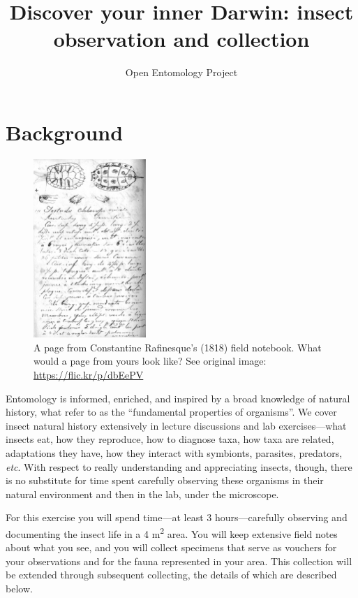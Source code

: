 \documentclass[letterpaper, 11pt]{article}
\title{Discover your inner Darwin: insect observation and collection}
\author{Open Entomology Project}
\begin{document}
\cleanlookdateon %
\maketitle
\thispagestyle{fancy}

\section*{Background}
\begin{figure}
  \vspace{-20pt}
  \begin{center}
    \includegraphics[width=0.38\textwidth]{Rafinesque}
  \end{center}
  \vspace{-16pt}
  \caption{A page from Constantine Rafinesque's (1818) field notebook. What would a page from yours look like? See original image: \url{https://flic.kr/p/dbEePV}}
  \vspace{-38pt}
\end{figure}
Entomology is informed, enriched, and inspired by a broad knowledge of natural history, what \cite{Tewksbury01042014} refer to as the ``fundamental properties of organisms''. We cover insect natural history extensively in lecture discussions and lab exercises---what insects eat, how they reproduce, how to diagnose taxa, how taxa are related, adaptations they have, how they interact with symbionts, parasites, predators, \textit{etc}. With respect to really understanding and appreciating insects, though, there is no substitute for time spent carefully observing these organisms in their natural environment and then in the lab, under the microscope. 

For this exercise you will spend time---at least 3 hours---carefully observing and documenting the insect life in a 4 m\textsuperscript{2} area. You will keep extensive field notes about what you see, and you will collect specimens that serve as vouchers for your observations and for the fauna represented in your area. This collection will be extended through subsequent collecting, the details of which are described below.
\end{document}
